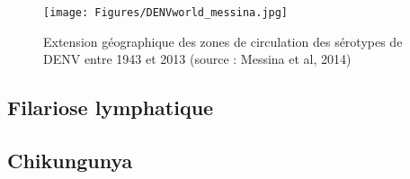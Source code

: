 \begin{figure}[t]
	\centering
	\texttt{[image: Figures/DENVworld\_messina.jpg]}
	\caption{Extension géographique des zones de circulation des sérotypes de DENV entre 1943 et 2013 (source : Messina et al, 2014)}
	\label{fig:denvworld}
\end{figure}




\subsection{Filariose lymphatique}

\subsection{Chikungunya}

%


